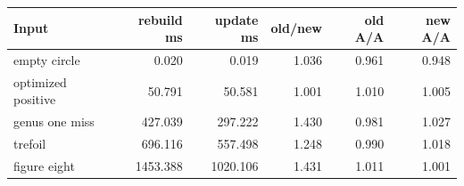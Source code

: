 \begin{center}
\small
\begin{tabular}{lrrrrr}
\toprule
Input & rebuild ms & update ms & old/new & old A/A & new A/A\\
\midrule
empty circle & 0.020 & 0.019 & 1.036 & 0.961 & 0.948\\
optimized positive & 50.791 & 50.581 & 1.001 & 1.010 & 1.005\\
genus one miss & 427.039 & 297.222 & 1.430 & 0.981 & 1.027\\
trefoil & 696.116 & 557.498 & 1.248 & 0.990 & 1.018\\
figure eight & 1453.388 & 1020.106 & 1.431 & 1.011 & 1.001\\
\bottomrule
\end{tabular}
\end{center}

